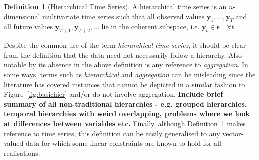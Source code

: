 \documentclass[12pt]{article}
\theoremstyle{definition}
\newtheorem{definition}{Definition}[section]
\theoremstyle{property}
\begin{document}
	 \begin{definition}[Hierarchical Time Series]\label{def:cohspace}
	 	A hierarchical time series is an $n$-dimensional multivariate time series such that all observed values $\bm{y}_1,\ldots,\bm{y}_T$ and all future values $\bm{y}_{T+1},\bm{y}_{T+2},\ldots$  lie in the coherent subspace, i.e. $\bm{y}_t\in\mathfrak{s}\quad\forall t$.
	 \end{definition}
	 
	 Despite the common use of the term {\em hierarchical time series}, it should be clear from the definition that the data need not necessarily follow a hierarchy.  Also notable by its absence in the above definition is any reference to {\em aggregation}. In some ways, terms such as {\em hierarchical} and {\em aggregation} can be misleading since the literature has covered instances that cannot be depicted in a similar fashion to Figure~\ref{fig:basichier} and/or do not involve aggregation. {\bf Include brief summary of all non-traditional hierarchies - e.g. grouped hierarchies, temporal hierarchies with weird overlapping, problems where we look at differences between variables etc.}  Finally, although Definition~\ref{def:cohspace} makes reference to time series, this definition can be easily generalised to any vector-valued data for which some linear constraints are known to hold for all realisations.
	 
	 
	 
	
%	
	
\end{document}
